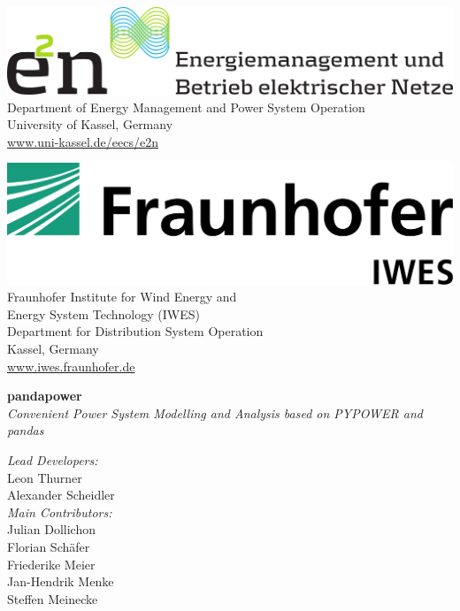 \begin{titlepage}
\vspace*{1cm} 

\center
\begin{minipage}[t]{0.45\textwidth}
\includegraphics[width=1\textwidth]{../report/e2n.png}\\[1.5em]
Department of Energy Management and Power System Operation \\[0.5em]
University of Kassel, Germany \\[0.5em]
\href{url}{www.uni-kassel.de/eecs/e2n}
\end{minipage}\hfill
\begin{minipage}[t]{0.45\textwidth}
\includegraphics[width=.75\textwidth]{../report/IWES.png} \\[1em]
Fraunhofer Institute for Wind Energy and \\ Energy System Technology (IWES) \\[0.5em]
Department for Distribution System Operation \\[0.5em]
Kassel, Germany \\[0.5em]
\href{url}{www.iwes.fraunhofer.de}
\end{minipage}



\vfill
\large
\flushleft
\begin{minipage}{0.5\textwidth}
\textbf{pandapower}\\[0.5em]
\textit{Convenient Power System Modelling and Analysis based on PYPOWER and pandas}\\[2em]
\end{minipage}

\textit{Lead Developers:}\\
Leon Thurner \\
Alexander Scheidler\\[1em]

\textit{Main Contributors:} \\
Julian Dollichon     \\
Florian Schäfer      \\
Friederike Meier     \\
Jan-Hendrik Menke    \\
Steffen Meinecke  \\[1em]


\end{titlepage}
